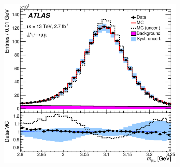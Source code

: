 

\begin{figure}[h!]
  \begin{center}
          \begin{subfigure}[b]{0.40\textwidth}  
    \includegraphics[width=\textwidth]{figures/MuonReco/JPsiMass.eps}
        \caption{ }
    \end{subfigure}
          \begin{subfigure}[b]{0.40\textwidth}  

\end{subfigure}
\end{center}
\end{figure}
